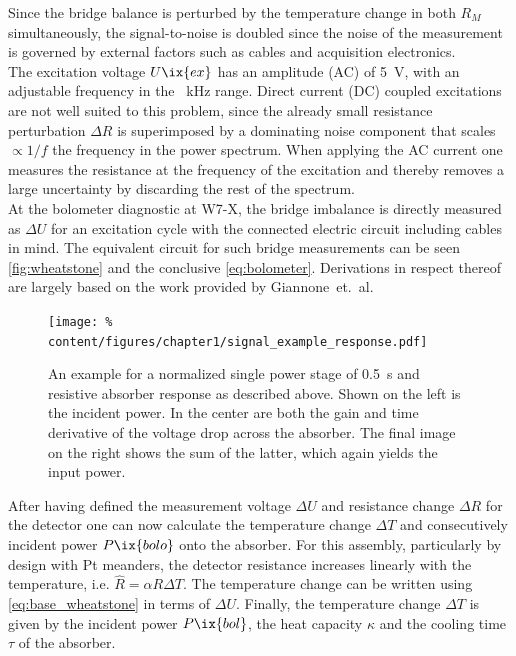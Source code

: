 %
                Since the bridge balance is perturbed by the temperature change in both $R_{M}$ simultaneously, the signal-to-noise is doubled since the noise of the measurement is governed by external factors such as cables and acquisition electronics.\\%
                The excitation voltage $U\ix{ex}$ has an amplitude (AC) of \SI{5}{\volt}, with an adjustable frequency in the \SI{}{\kilo\hertz} range. Direct current (DC) coupled excitations are not well suited to this problem, since the already small resistance perturbation $\Delta R$ is superimposed by a dominating noise component that scales $\propto 1/f$ the frequency in the power spectrum\cite{Horowitz1989,Weissman1988}. When applying the AC current one measures the resistance at the frequency of the excitation and thereby removes a large uncertainty by discarding the rest of the spectrum.\\%
                At the bolometer diagnostic at W7-X, the bridge imbalance is directly measured as $\Delta U$ for an excitation cycle with the connected electric circuit including cables in mind. The equivalent circuit for such bridge measurements can be seen \cref{fig:wheatstone} and the conclusive \cref{eq:bolometer}. Derivations in respect thereof are largely based on the work provided by Giannone~et.~al\cite{Giannone2002}.\\%
%
                    \begin{figure}%
                        \centering%
                        \texttt{[image: \%
                            content/figures/chapter1/signal\_example\_response.pdf]}%
                        \caption{An example for a normalized single power stage of \SI{0.5}{\second} and resistive absorber response as described above. Shown on the left is the incident power. In the center are both the gain and time derivative of the voltage drop across the absorber. The final image on the right shows the sum of the latter, which again yields the input power.}\label{fig:signal_example}%
                    \end{figure}%
%
                After having defined the measurement voltage $\Delta U$ and resistance change $\Delta R$ for the detector one can now calculate the temperature change $\Delta T$ and consecutively incident power $P\ix{bolo}$ onto the absorber. For this assembly, particularly by design with Pt meanders, the detector resistance increases linearly with the temperature, i.e. $\hat{R}=\alpha R\Delta T$. The temperature change can be written using \cref{eq:base_wheatstone} in terms of $\Delta U$. Finally, the temperature change $\Delta T$ is given by the incident power $P\ix{bol}$, the heat capacity $\kappa$ and the cooling time $\tau$ of the absorber.%
